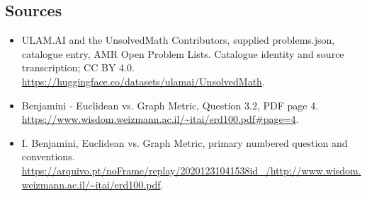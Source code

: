 \documentclass[11pt,a4paper]{article}
\begin{document}
\subsection{Sources}
\begin{itemize}
\item[S1] ULAM.AI and the UnsolvedMath Contributors, supplied problems.json, catalogue entry, AMR Open Problem Lists. Catalogue identity and source transcription; CC BY 4.0.
\url{https://huggingface.co/datasets/ulamai/UnsolvedMath}.
\item[S2] Benjamini - Euclidean vs. Graph Metric, Question 3.2, PDF page 4. 
\url{https://www.wisdom.weizmann.ac.il/~itai/erd100.pdf#page=4}.
\item[S3] I. Benjamini, Euclidean vs. Graph Metric, primary numbered question and conventions.
\url{https://arquivo.pt/noFrame/replay/20201231041538id_/http://www.wisdom.weizmann.ac.il/~itai/erd100.pdf}.
\end{itemize}
\end{document}
